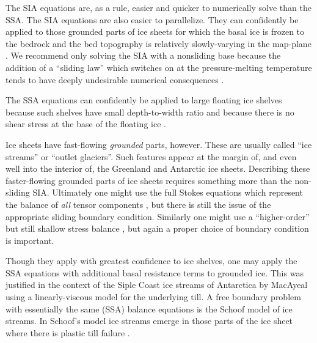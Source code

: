 \documentclass[11pt,final]{amsart}
\begin{document}
The SIA equations are, as a rule, easier and quicker to numerically solve than the SSA.  The SIA equations are also easier to parallelize.  They can confidently be applied to those grounded parts of ice sheets for which the basal ice is frozen to the bedrock and the bed topography is relatively slowly-varying in the map-plane \cite{Fowler}.  We recommend only solving the SIA with a nonsliding base because the addition of a ``sliding law'' which switches on at the pressure-melting temperature tends to have deeply undesirable numerical consequences \cite{BBssasliding}.

The SSA equations can confidently be applied to large floating ice shelves because such shelves have small depth-to-width ratio and because there is no shear stress at the base of the floating ice \cite{Morland,MorlandZainuddin}.

Ice sheets have fast-flowing \emph{grounded} parts, however.  These are usually called ``ice streams'' or ``outlet glaciers''.  Such features appear at the margin of, and even well into the interior of, the Greenland \cite{Joughinetal2001} and Antarctic \cite{BamberVaughanJoughin} ice sheets.  Describing these faster-flowing grounded parts of ice sheets requires something more than the non-sliding SIA.  Ultimately one might use the full Stokes equations which represent the balance of \emph{all} tensor components \cite{Fowler}, but there is still the issue of the appropriate sliding boundary condition.  Similarly one might use a ``higher-order'' but still shallow stress balance \cite{Blatter,Pattyn03}, but again a proper choice of boundary condition is important.

Though they apply with greatest confidence to ice shelves, one may apply the SSA equations with additional basal resistance terms to grounded ice.  This was justified in the context of the Siple Coast ice streams of Antarctica by MacAyeal \cite{MacAyeal,HulbeMacAyeal} using a linearly-viscous model for the underlying till.  A free boundary problem with essentially the same (SSA) balance equations is the Schoof \cite{SchoofStream} model of ice streams.  In Schoof's model ice streams emerge in those parts of the ice sheet where there is plastic till failure \cite{Paterson}.
\end{document}
